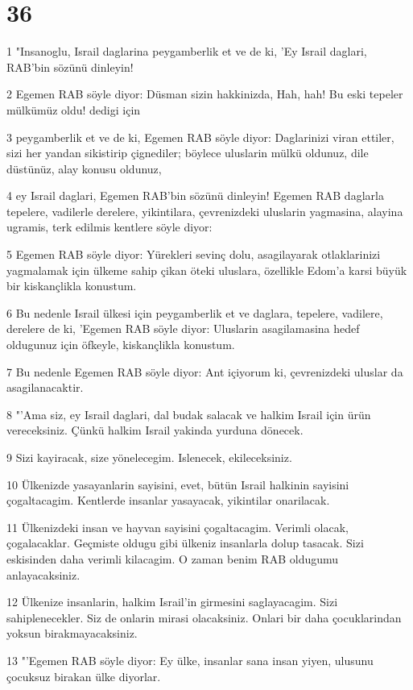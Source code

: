 \chapter{36}

\par 1 "Insanoglu, Israil daglarina peygamberlik et ve de ki, 'Ey Israil daglari, RAB'bin sözünü dinleyin!
\par 2 Egemen RAB söyle diyor: Düsman sizin hakkinizda, Hah, hah! Bu eski tepeler mülkümüz oldu! dedigi için
\par 3 peygamberlik et ve de ki, Egemen RAB söyle diyor: Daglarinizi viran ettiler, sizi her yandan sikistirip çignediler; böylece uluslarin mülkü oldunuz, dile düstünüz, alay konusu oldunuz,
\par 4 ey Israil daglari, Egemen RAB'bin sözünü dinleyin! Egemen RAB daglarla tepelere, vadilerle derelere, yikintilara, çevrenizdeki uluslarin yagmasina, alayina ugramis, terk edilmis kentlere söyle diyor:
\par 5 Egemen RAB söyle diyor: Yürekleri sevinç dolu, asagilayarak otlaklarinizi yagmalamak için ülkeme sahip çikan öteki uluslara, özellikle Edom'a karsi büyük bir kiskançlikla konustum.
\par 6 Bu nedenle Israil ülkesi için peygamberlik et ve daglara, tepelere, vadilere, derelere de ki, 'Egemen RAB söyle diyor: Uluslarin asagilamasina hedef oldugunuz için öfkeyle, kiskançlikla konustum.
\par 7 Bu nedenle Egemen RAB söyle diyor: Ant içiyorum ki, çevrenizdeki uluslar da asagilanacaktir.
\par 8 "'Ama siz, ey Israil daglari, dal budak salacak ve halkim Israil için ürün vereceksiniz. Çünkü halkim Israil yakinda yurduna dönecek.
\par 9 Sizi kayiracak, size yönelecegim. Islenecek, ekileceksiniz.
\par 10 Ülkenizde yasayanlarin sayisini, evet, bütün Israil halkinin sayisini çogaltacagim. Kentlerde insanlar yasayacak, yikintilar onarilacak.
\par 11 Ülkenizdeki insan ve hayvan sayisini çogaltacagim. Verimli olacak, çogalacaklar. Geçmiste oldugu gibi ülkeniz insanlarla dolup tasacak. Sizi eskisinden daha verimli kilacagim. O zaman benim RAB oldugumu anlayacaksiniz.
\par 12 Ülkenize insanlarin, halkim Israil'in girmesini saglayacagim. Sizi sahiplenecekler. Siz de onlarin mirasi olacaksiniz. Onlari bir daha çocuklarindan yoksun birakmayacaksiniz.
\par 13 "'Egemen RAB söyle diyor: Ey ülke, insanlar sana insan yiyen, ulusunu çocuksuz birakan ülke diyorlar.
